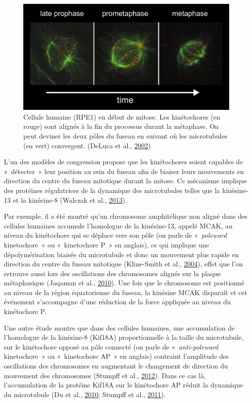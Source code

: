 \documentclass[12pt,a4paper,twoside,openright]{book}
\begin{document}
\begin{figure}[htbp]
\centering
\includegraphics{figures/intro/congression.png}
\caption[Cellule humaine de la prophase à la métaphase]{\label{fig:congression}Cellule
humaine (RPE1) en début de mitose. Les kinétochores (en rouge) sont
alignés à la fin du processus durant la métaphase. On peut deviner les
deux pôles du fuseau en suivant où les microtubules (en vert)
convergent. (DeLuca et al., \protect\hyperlink{ref-DeLuca2002}{2002})}
\end{figure}

L'un des modèles de congression propose que les kinétochores soient
capables de «~détecter~» leur position au sein du fuseau afin de biaiser
leurs mouvements en direction du centre du fuseau mitotique durant la
mitose. Ce mécanisme implique des protéines régulatrices de la dynamique
des microtubules telles que la kinésine-13 et la kinésine-8 (Walczak et
al., \protect\hyperlink{ref-Walczak2013a}{2013}).

Par exemple, il a été montré qu'un chromosome amphitélique non aligné
dans des cellules humaines accumule l'homologue de la kinésine-13,
appelé MCAK, au niveau du kinétochore qui se déplace vers son pôle (on
parle de «~\emph{poleward} kinetochore~» ou «~kinetochore P~» en
anglais), ce qui implique une dépolymérisation biaisée du microtubule et
donc un mouvement plus rapide en direction du centre du fuseau mitotique
(Kline-Smith et al., \protect\hyperlink{ref-Kline-Smith2004}{2004}),
effet que l'on retrouve aussi lors des oscillations des chromosomes
alignés sur la plaque métaphasique (Jaqaman et al.,
\protect\hyperlink{ref-Jaqaman2010}{2010}). Une fois que le chromosome
est positionné au niveau de la région équatorienne du fuseau, la
kinésine MCAK disparaît et cet événement s'accompagne d'une réduction de
la force appliquée au niveau du kinétochore P.

Une autre étude montre que dans des cellules humaines, une accumulation
de l'homologue de la kinésine-8 (Kif18A) proportionnelle à la taille du
microtubule, sur le kinétochore opposé au pôle connecté (on parle de
«~\emph{anti-poleward} kinetochore~» ou «~kinetochore AP~» en anglais)
contraint l'amplitude des oscillations des chromosomes en augmentant le
changement de direction du mouvement des chromosomes (Stumpff et al.,
\protect\hyperlink{ref-Stumpff2012}{2012}). Dans ce cas là,
l'accumulation de la protéine Kif18A sur le kinétochore AP réduit la
dynamique du microtubule (Du et al.,
\protect\hyperlink{ref-Du2010}{2010}; Stumpff et al.,
\protect\hyperlink{ref-Stumpff2011a}{2011}).
\end{document}
